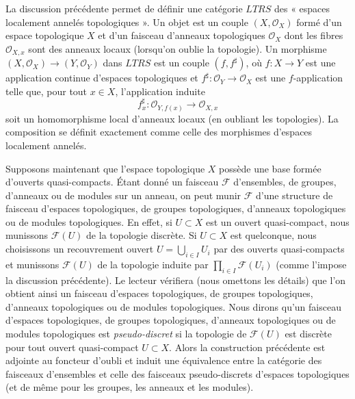 \medskip\noindent
La discussion précédente permet de définir une catégorie $LTRS$ des
« espaces localement annelés topologiques ». Un objet est un couple
$(X, \mathcal{O}_X)$ formé d'un espace topologique
$X$ et d'un faisceau d'anneaux topologiques $\mathcal{O}_X$ dont les fibres
$\mathcal{O}_{X, x}$ sont des anneaux locaux (lorsqu'on oublie la topologie).
Un morphisme $(X, \mathcal{O}_X) \to (Y, \mathcal{O}_Y)$ dans
$LTRS$ est un couple $(f, f^\sharp)$, où $f : X \to Y$ est une application
continue d'espaces topologiques et $f^\sharp : \mathcal{O}_Y \to \mathcal{O}_X$
est une $f$-application telle que, pour tout $x \in X$, l'application induite
$$
f^\sharp_x : \mathcal{O}_{Y, f(x)} \longrightarrow \mathcal{O}_{X, x}
$$
soit un homomorphisme local d'anneaux locaux (en oubliant les topologies).
La composition se définit exactement comme celle des
morphismes d'espaces localement annelés.

\medskip\noindent
Supposons maintenant que l'espace topologique $X$ possède une base formée
d'ouverts quasi-compacts. Étant donné un faisceau $\mathcal{F}$ d'ensembles, de groupes,
d'anneaux ou de modules sur un anneau, on peut munir $\mathcal{F}$
d'une structure de faisceau d'espaces topologiques, de groupes topologiques,
d'anneaux topologiques ou de modules topologiques.
En effet, si $U \subset X$ est un ouvert quasi-compact,
nous munissons $\mathcal{F}(U)$ de la topologie discrète. Si $U \subset X$
est quelconque, nous choisissons un recouvrement ouvert $U = \bigcup_{i \in I} U_i$
par des ouverts quasi-compacts et munissons $\mathcal{F}(U)$
de la topologie induite par $\prod_{i \in I} \mathcal{F}(U_i)$
(comme l'impose la discussion précédente).
Le lecteur vérifiera (nous omettons les détails) que l'on obtient ainsi un faisceau d'espaces topologiques,
de groupes topologiques, d'anneaux topologiques ou de modules topologiques.
Nous dirons qu'un faisceau d'espaces topologiques, de groupes topologiques,
d'anneaux topologiques ou de modules topologiques est
{\it pseudo-discret} si la topologie de $\mathcal{F}(U)$ est
discrète pour tout ouvert quasi-compact $U \subset X$. Alors
la construction précédente est adjointe au foncteur d'oubli
et induit une équivalence entre la catégorie des faisceaux
d'ensembles et celle des faisceaux pseudo-discrets d'espaces topologiques
(et de même pour les groupes, les anneaux et les modules).


